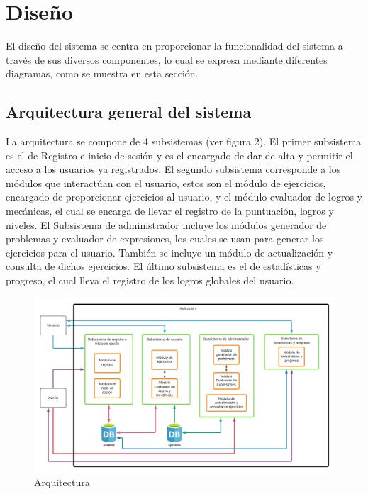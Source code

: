 \documentclass{article}
\begin{document}
\section{Diseño}
El diseño del sistema se centra en proporcionar la funcionalidad del sistema a través de sus diversos componentes, lo cual se expresa mediante diferentes diagramas, como se muestra en esta sección.
\subsection{Arquitectura general del sistema}%
La arquitectura se compone de 4 subsistemas (ver figura 2).  El primer subsistema es el de Registro e inicio de sesión y es el encargado de dar de alta y permitir el acceso a los usuarios ya registrados. El segundo subsistema corresponde a los módulos que interactúan con el usuario, estos son el módulo de ejercicios, encargado de proporcionar ejercicios al usuario, y el módulo evaluador de logros y mecánicas, el cual se encarga de llevar el registro de la puntuación, logros y niveles. El Subsistema de administrador incluye los módulos generador de problemas y evaluador de expresiones, los cuales se usan para generar los ejercicios para el usuario. También se incluye un módulo de actualización y consulta de dichos ejercicios. El último subsistema es el de estadísticas y progreso, el cual lleva el registro de los logros globales del usuario.  
\begin{figure}[H]
    \centering
    \includegraphics[scale=0.65]{imgs/Arquitectura}
    \caption{Arquitectura}
\end{figure}
\end{document}
